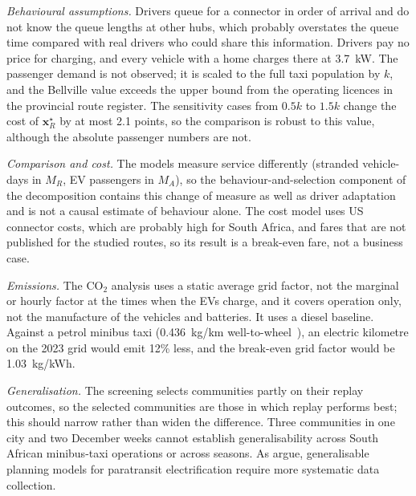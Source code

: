 \documentclass{elsarticle}
\newcommand{\MR}{\ensuremath{M_R}}
\newcommand{\MA}{\ensuremath{M_A}}
\newcommand{\xR}{\ensuremath{\mathbf{x}_R^{\star}}}
\begin{document}
\emph{Behavioural assumptions.} Drivers queue for a connector in order of arrival and do not know the queue lengths at other hubs, which probably overstates the queue time compared with real drivers who could share this information. Drivers pay no price for charging, and every vehicle with a home charges there at 3.7~kW. The passenger demand is not observed; it is scaled to the full taxi population by $k$, and the Bellville value exceeds the upper bound from the operating licences in the provincial route register. The sensitivity cases from $0.5k$ to $1.5k$ change the cost of \xR{} by at most 2.1 points, so the comparison is robust to this value, although the absolute passenger numbers are not.

\emph{Comparison and cost.} The models measure service differently (stranded vehicle-days in \MR, EV passengers in \MA), so the behaviour-and-selection component of the decomposition contains this change of measure as well as driver adaptation and is not a causal estimate of behaviour alone. The cost model uses US connector costs, which are probably high for South Africa, and fares that are not published for the studied routes, so its result is a break-even fare, not a business case.

\emph{Emissions.} The CO$_2$ analysis uses a static average grid factor, not the marginal or hourly factor at the times when the EVs charge, and it covers operation only, not the manufacture of the vehicles and batteries. It uses a diesel baseline. Against a petrol minibus taxi (0.436~kg/km well-to-wheel~\cite{sello2026_embt_in_cpt}), an electric kilometre on the 2023 grid would emit 12\% less, and the break-even grid factor would be 1.03~kg/kWh.

\emph{Generalisation.} The screening selects communities partly on their replay outcomes, so the selected communities are those in which replay performs best; this should narrow rather than widen the difference. Three communities in one city and two December weeks cannot establish generalisability across South African minibus-taxi operations or across seasons. As \citet{collett2021_ssa_paratransit_decarbonisation_data} argue, generalisable planning models for paratransit electrification require more systematic data collection.
\end{document}
